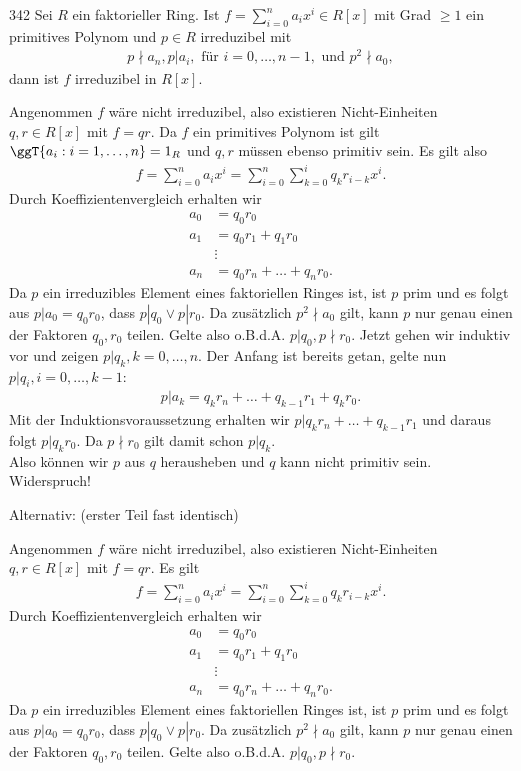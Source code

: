 \begin{algebraUE}{342}
Sei $R$ ein faktorieller Ring. Ist $f = \sum_{i=0}^na_ix^i \in R[x]$ mit Grad $\geq 1$
ein primitives Polynom und $p \in R$ irreduzibel mit
\begin{align*}
  p \nmid a_n, p | a_i, \text{ für } i = 0,\dots,n-1, \text{ und } p^2 \nmid a_0,
\end{align*}
dann ist $f$ irreduzibel in $R[x]$.
\end{algebraUE}

\begin{solution}
Angenommen $f$ wäre nicht irreduzibel, also existieren Nicht-Einheiten $q,r \in R[x]$ mit $f = qr$.
Da $f$ ein primitives Polynom ist gilt $\ggT\{a_i: i = 1,\dots,n\} = 1_R$ und $q,r$
müssen ebenso primitiv sein. Es gilt also
\begin{align*}
  f = \sum_{i=0}^na_ix^i = \sum_{i = 0}^n \sum_{k= 0}^i q_kr_{i-k}x^i.
\end{align*}
Durch Koeffizientenvergleich erhalten wir
\begin{align*}
  a_0 &= q_0r_0 \\
  a_1 &= q_0r_1 + q_1r_0 \\
  &\vdots \\
  a_n &= q_0r_n + \dots + q_nr_0.
\end{align*}
Da $p$ ein irreduzibles Element eines faktoriellen Ringes ist, ist $p$ prim und es folgt
aus $p| a_0 = q_0r_0$, dass $p|q_0 \lor p|r_0$. Da zusätzlich $p^2 \nmid a_0$ gilt,
kann $p$ nur genau einen der Faktoren $q_0,r_0$ teilen. Gelte also o.B.d.A. $p | q_0, p \nmid r_0$.
Jetzt gehen wir induktiv vor und zeigen $p | q_k, k = 0,\dots,n$. Der Anfang ist bereits getan,
gelte nun $p | q_{i}, i = 0,\dots,k-1$:
\begin{align*}
  p | a_k = q_kr_n + \dots + q_{k-1}r_1 + q_kr_0.
\end{align*}
Mit der Induktionsvoraussetzung erhalten wir $p | q_kr_n + \dots + q_{k-1}r_1$
und daraus folgt $p | q_kr_0$. Da $p \nmid r_0$ gilt damit schon $p | q_k$. \\
Also können wir $p$ aus $q$ herausheben und $q$ kann nicht primitiv sein. Widerspruch!

Alternativ: (erster Teil fast identisch)

Angenommen $f$ wäre nicht irreduzibel, also existieren Nicht-Einheiten $q,r \in R[x]$ mit $f = qr$.
Es gilt
\begin{align*}
  f = \sum_{i=0}^na_ix^i = \sum_{i = 0}^n \sum_{k= 0}^i q_kr_{i-k}x^i.
\end{align*}
Durch Koeffizientenvergleich erhalten wir
\begin{align*}
  a_0 &= q_0r_0 \\
  a_1 &= q_0r_1 + q_1r_0 \\
  &\vdots \\
  a_n &= q_0r_n + \dots + q_nr_0.
\end{align*}
Da $p$ ein irreduzibles Element eines faktoriellen Ringes ist, ist $p$ prim und es folgt
aus $p| a_0 = q_0r_0$, dass $p|q_0 \lor p|r_0$. Da zusätzlich $p^2 \nmid a_0$ gilt,
kann $p$ nur genau einen der Faktoren $q_0,r_0$ teilen. Gelte also o.B.d.A. $p | q_0, p \nmid r_0$.


\end{solution}
